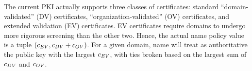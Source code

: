 The current PKI actually supports three classes of certificates: 
standard ``domain-validated'' (DV) certificates,
``organization-validated'' (OV) certificates,
and
extended validation (EV) certificates.
EV certificates require domains to undergo more rigorous screening than the other two.
Hence, the actual \ac{name} policy value is a tuple $(c_{EV}, c_{DV} + c_{OV})$.
For a given domain, \ac{name} will treat as authoritative the public
key with the largest $c_{EV}$, with ties broken based on the largest sum 
of $c_{DV}$ and $c_{OV}$.





